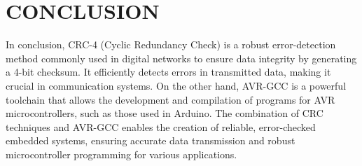 \documentclass[conference]{IEEEtran}
\begin{document}
\section{CONCLUSION}
In conclusion, CRC-4 (Cyclic Redundancy Check) is a robust error-detection method commonly used in digital networks to ensure data integrity by generating a 4-bit checksum. It efficiently detects errors in transmitted data, making it crucial in communication systems. On the other hand, AVR-GCC is a powerful toolchain that allows the development and compilation of programs for AVR microcontrollers, such as those used in Arduino. The combination of CRC techniques and AVR-GCC enables the creation of reliable, error-checked embedded systems, ensuring accurate data transmission and robust microcontroller programming for various applications.
\end{document}
